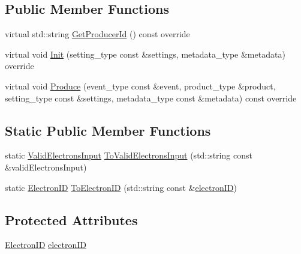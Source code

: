 \subsection*{Public Member Functions}
\begin{DoxyCompactItemize}
\item 
virtual std::string \hyperlink{classTagAndProbeElectronPairProducer_a378c649f26b158f90e9e0faacea2ac47}{GetProducerId} () const override
\item 
virtual void \hyperlink{classTagAndProbeElectronPairProducer_a24874428037dc66e71e7f6f90f240612}{Init} (setting\_\-type const \&settings, metadata\_\-type \&metadata) override
\item 
virtual void \hyperlink{classTagAndProbeElectronPairProducer_a8ce87461c4370a9cee8acbd5b95d4054}{Produce} (event\_\-type const \&event, product\_\-type \&product, setting\_\-type const \&settings, metadata\_\-type const \&metadata) const override
\end{DoxyCompactItemize}
\subsection*{Static Public Member Functions}
\begin{DoxyCompactItemize}
\item 
static \hyperlink{classTagAndProbeElectronPairProducer_a1e84988dfb1232821fb29999308985b8}{ValidElectronsInput} \hyperlink{classTagAndProbeElectronPairProducer_a8e225e450795c93748853aae2db87617}{ToValidElectronsInput} (std::string const \&validElectronsInput)
\item 
static \hyperlink{classTagAndProbeElectronPairProducer_a0e5505ee08adec94faa1c6d76a9d6c58}{ElectronID} \hyperlink{classTagAndProbeElectronPairProducer_a2c9fe72c7bef27a25b703bcc94486631}{ToElectronID} (std::string const \&\hyperlink{classTagAndProbeElectronPairProducer_a7f5635442607a6ab2f0414729baeefe7}{electronID})
\end{DoxyCompactItemize}
\subsection*{Protected Attributes}
\begin{DoxyCompactItemize}
\item 
\hyperlink{classTagAndProbeElectronPairProducer_a0e5505ee08adec94faa1c6d76a9d6c58}{ElectronID} \hyperlink{classTagAndProbeElectronPairProducer_a7f5635442607a6ab2f0414729baeefe7}{electronID}
\end{DoxyCompactItemize}


